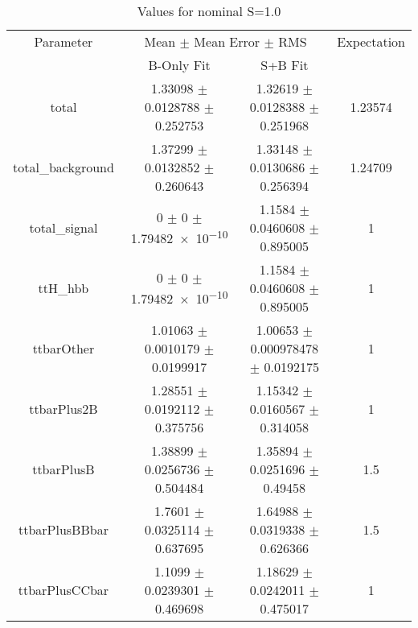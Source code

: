 \begin{table}
\centering
\caption{Values for nominal S=1.0}
\begin{tabular}{cccc}
\toprule
Parameter & \multicolumn{2}{c}{Mean $\pm$ Mean Error $\pm$ RMS} & Expectation\\
 & B-Only Fit & S+B Fit & \\
\midrule
total & \num{1.33098} $\pm$ \num{0.0128788} $\pm$ \num{0.252753} & \num{1.32619} $\pm$ \num{0.0128388} $\pm$ \num{0.251968} & \num{1.23574}\\
total\_background & \num{1.37299} $\pm$ \num{0.0132852} $\pm$ \num{0.260643} & \num{1.33148} $\pm$ \num{0.0130686} $\pm$ \num{0.256394} & \num{1.24709}\\
total\_signal & \num{0} $\pm$ \num{0} $\pm$ \num{1.79482e-10} & \num{1.1584} $\pm$ \num{0.0460608} $\pm$ \num{0.895005} & \num{1}\\
ttH\_hbb & \num{0} $\pm$ \num{0} $\pm$ \num{1.79482e-10} & \num{1.1584} $\pm$ \num{0.0460608} $\pm$ \num{0.895005} & \num{1}\\
ttbarOther & \num{1.01063} $\pm$ \num{0.0010179} $\pm$ \num{0.0199917} & \num{1.00653} $\pm$ \num{0.000978478} $\pm$ \num{0.0192175} & \num{1}\\
ttbarPlus2B & \num{1.28551} $\pm$ \num{0.0192112} $\pm$ \num{0.375756} & \num{1.15342} $\pm$ \num{0.0160567} $\pm$ \num{0.314058} & \num{1}\\
ttbarPlusB & \num{1.38899} $\pm$ \num{0.0256736} $\pm$ \num{0.504484} & \num{1.35894} $\pm$ \num{0.0251696} $\pm$ \num{0.49458} & \num{1.5}\\
ttbarPlusBBbar & \num{1.7601} $\pm$ \num{0.0325114} $\pm$ \num{0.637695} & \num{1.64988} $\pm$ \num{0.0319338} $\pm$ \num{0.626366} & \num{1.5}\\
ttbarPlusCCbar & \num{1.1099} $\pm$ \num{0.0239301} $\pm$ \num{0.469698} & \num{1.18629} $\pm$ \num{0.0242011} $\pm$ \num{0.475017} & \num{1}\\
\bottomrule
\end{tabular}
\end{table}